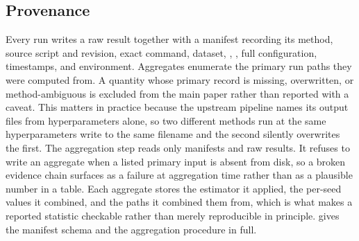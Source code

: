 \subsection{Provenance}
\label{sec:provenance}

Every run writes a raw result together with a manifest recording its method,
source script and revision, exact command, dataset, \splitseed, \trajseed, full
configuration, timestamps, and environment. Aggregates enumerate the primary run
paths they were computed from. A quantity whose primary record is missing,
overwritten, or method-ambiguous is excluded from the main paper rather than
reported with a caveat. This matters in practice because the upstream pipeline
names its output files from hyperparameters alone, so two different methods run
at the same hyperparameters write to the same filename and the second silently
overwrites the first. The aggregation step reads only manifests and raw results. It refuses to write
an aggregate when a listed primary input is absent from disk, so a broken
evidence chain surfaces as a failure at aggregation time rather than as a
plausible number in a table. Each aggregate stores the estimator it applied, the
per-seed values it combined, and the paths it combined them from, which is what
makes a reported statistic checkable rather than merely reproducible in
principle.  gives the manifest schema and the
aggregation procedure in full.
